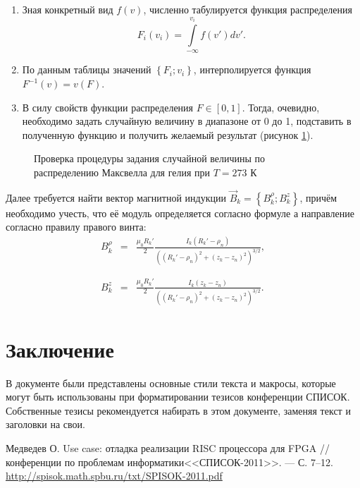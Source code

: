 \documentclass{spisok-article}
\begin{document}
\begin{enumerate}
	\item Зная конкретный вид $f(v)$, численно табулируется функция распределения
	\begin{equation}
	F_i (v_i) = \int\limits_{- \infty}^{v_i} f(v') dv'.
	\end{equation}
	\item По данным таблицы значений $\left\{ F_i ; v_i  \right\}$, интерполируется функция  $F^{-1}(v) = v(F)$.
	\item В силу свойств функции распределения $F \in \left[0,1\right]$. Тогда, очевидно, необходимо задать случайную величину в диапазоне от 0 до 1, подставить в полученную функцию и получить желаемый результат (рисунок \ref{fig:He(T=273)}).
\end{enumerate}
\begin{figure}[h!]
	\centering
	\caption{Проверка процедуры задания случайной величины по распределению Максвелла для гелия при $T = 273 \text{ К}$}
	\label{fig:He(T=273)}
\end{figure}

Далее требуется найти вектор магнитной индукции $\vec{B}_k = \left\{ B^{\rho}_k; B_k^z \right\}$, причём необходимо учесть, что её модуль определяется согласно формуле  а направление согласно правилу правого винта:
\begin{eqnarray}
B^{\rho}_k &=& \frac{\mu_0 R_k'}{2} \frac{I_k \left( R_k' - \rho_n \right)}{\left( \left( R_k' - \rho_n \right)^2 + \left( z_k - z_n \right)^2 \right)^{3/2}}, \\ \nonumber \\ \nonumber \\

B^{z}_k &=& \frac{\mu_0 R_k'}{2} \frac{I_k \left( z_k - z_n \right)}{\left( \left( R_k' - \rho_n \right)^2 + \left( z_k - z_n \right)^2 \right)^{3/2}}.
\end{eqnarray}

\section{Заключение}

В документе были представлены основные стили текста и макросы, которые
могут быть использованы при форматировании тезисов конференции СПИСОК.
Собственные тезисы рекомендуется набирать в этом документе, заменяя
текст и заголовки на свои.

\makeatletter\renewcommand{\refname}{\intl@references}\makeatother
\begin{thebibliography}{8}

 Медведев О. Use case: отладка реализации RISC
  процессора для FPGA // %
  конференции по проблемам информатики<<СПИСОК-2011>>. --- %
  С. 7--12.
  \href{http://spisok.math.spbu.ru/txt/SPISOK-2011.pdf}{http://spisok.math.spbu.ru/txt/SPISOK-2011.pdf}

\end{thebibliography}
\end{document}
